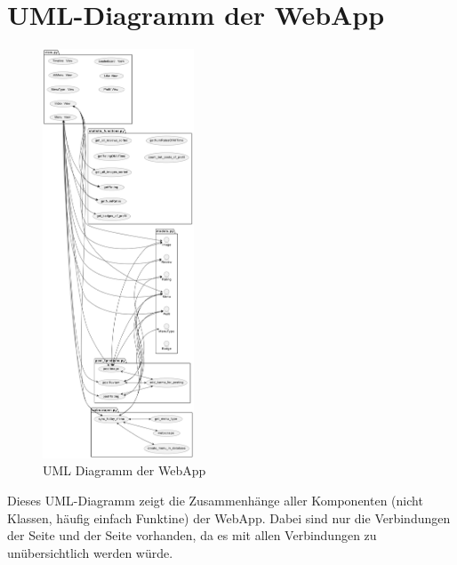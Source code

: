 \section{UML-Diagramm der WebApp} \label{sec:UMLS}
\begin{figure}[ht]
    \centering
    \includegraphics[width=0.4\textwidth]{images/UML-Specific.png}
    \caption{UML Diagramm der WebApp}
    \label{fig:DB}
\end{figure}

Dieses UML-Diagramm zeigt die Zusammenhänge aller Komponenten (nicht Klassen,
häufig einfach Funktine) der WebApp. Dabei sind nur die Verbindungen der
 Seite und der  Seite vorhanden, da es mit allen
Verbindungen zu unübersichtlich werden würde.

\newpage

